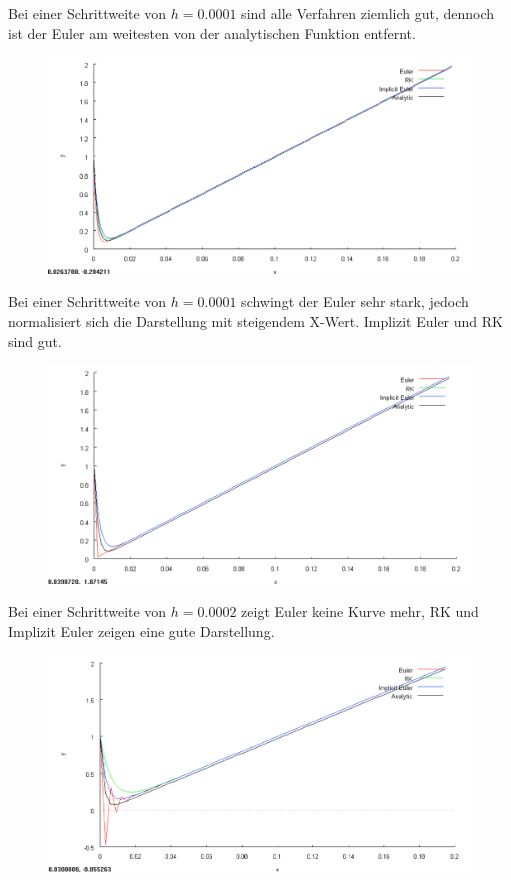 \documentclass[10pt,a4paper]{article}
\begin{document}
Bei einer Schrittweite von $h = 0.0001$ sind alle Verfahren ziemlich gut, dennoch ist der Euler am weitesten von der analytischen Funktion entfernt.
\begin{figure}[H]
\centering
\includegraphics[width=0.9\linewidth]{../screenshots/stiff0001.png}
\end{figure}
Bei einer Schrittweite von $h = 0.0001$ schwingt der Euler sehr stark, jedoch normalisiert sich die Darstellung mit steigendem X-Wert. Implizit Euler und RK sind gut.
\begin{figure}[H]
\centering
\includegraphics[width=0.9\linewidth]{../screenshots/stiff0002.png}
\end{figure}
Bei einer Schrittweite von $h = 0.0002$ zeigt Euler keine Kurve mehr, RK und Implizit Euler zeigen eine gute Darstellung.
\begin{figure}[H]
\centering
\includegraphics[width=0.9\linewidth]{../screenshots/stiff0003.png}
\end{figure}
\end{document}
